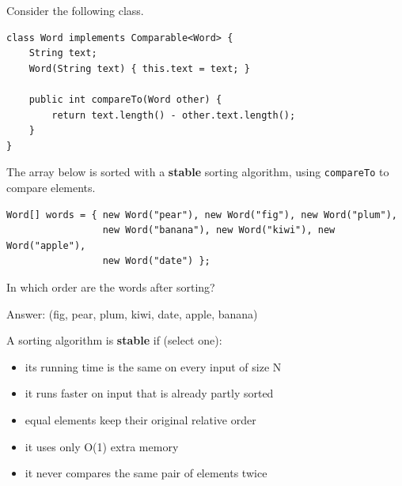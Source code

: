 \begin{question}
Consider the following class.

\begin{lstlisting}
class Word implements Comparable<Word> {
    String text;
    Word(String text) { this.text = text; }

    public int compareTo(Word other) {
        return text.length() - other.text.length();
    }
}
\end{lstlisting}

The array below is sorted with a \textbf{stable} sorting algorithm, using \lstinline|compareTo| to compare elements.

\begin{lstlisting}
Word[] words = { new Word("pear"), new Word("fig"), new Word("plum"),
                 new Word("banana"), new Word("kiwi"), new Word("apple"),
                 new Word("date") };
\end{lstlisting}

In which order are the words after sorting?

Answer: \underline{\hspace{3in}} \ifanswers (fig, pear, plum, kiwi, date, apple, banana)\fi
\end{question}

\begin{question}
A sorting algorithm is \textbf{stable} if (select one):
\begin{itemize}[leftmargin=2em,itemsep=1pt,topsep=2pt]
\item[\cb{0}] its running time is the same on every input of size N
\item[\cb{0}] it runs faster on input that is already partly sorted
\item[\cb{1}] equal elements keep their original relative order
\item[\cb{0}] it uses only O(1) extra memory
\item[\cb{0}] it never compares the same pair of elements twice
\end{itemize}
\end{question}

